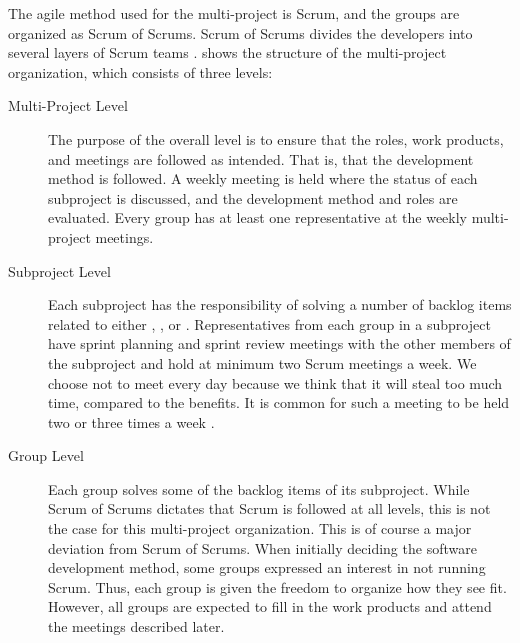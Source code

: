The agile method used for the multi-project is Scrum, and the groups are organized as Scrum of Scrums. Scrum of Scrums divides the developers into several layers of Scrum teams \parencite{scrum_of_scrums2015}.  shows the structure of the multi-project organization, which consists of three levels:

\begin{description}
  \item[Multi-Project Level] The purpose of the overall level is to ensure that the roles, work products, and meetings are followed as intended. That is, that the development method is followed. A weekly meeting is held where the status of each subproject is discussed, and the development method and roles are evaluated. Every group has at least one representative at the weekly multi-project meetings.
  \item[Subproject Level] Each subproject has the responsibility of solving a number of backlog items related to either \gui, \db, or \bd. Representatives from each group in a subproject have sprint planning and sprint review meetings with the other members of the subproject and hold at minimum two Scrum meetings a week. We choose not to meet every day because we think that it will steal too much time, compared to the benefits. It is common for such a meeting to be held two or three times a week \parencite{scrum_of_scrums2015}.
  \item[Group Level] Each group solves some of the backlog items of its subproject. While Scrum of Scrums dictates that Scrum is followed at all levels, this is not the case for this multi-project organization. This is of course a major deviation from Scrum of Scrums. When initially deciding the software development method, some groups expressed an interest in not running Scrum. Thus, each group is given the freedom to organize how they see fit. However, all groups are expected to fill in the work products and attend the meetings described later.
\end{description}


